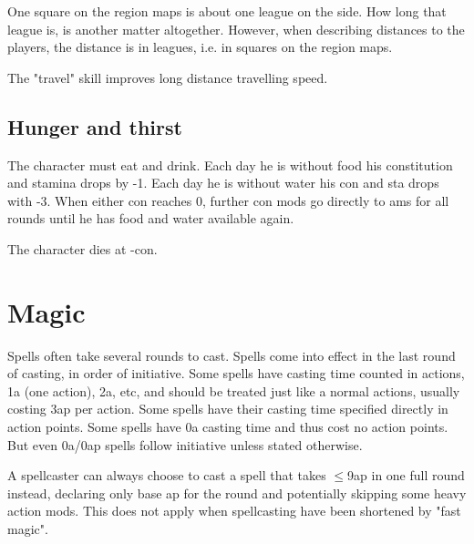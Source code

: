 One square on the region maps is about one league on the side. How long that league is, is another matter altogether. However, when describing distances to the players, the distance is in leagues, i.e. in squares on the region maps.


The "travel" skill improves long distance travelling speed.


\subsection*{Hunger and thirst}
The character must eat and drink. Each day he is without food his constitution and stamina drops by -1. Each day he is without water his con and sta drops with -3. When either con reaches 0, further con mods go directly to ams for all rounds until he has food and water available again.

The character dies at -con.











\section*{Magic}


Spells often take several rounds to cast. Spells come into effect in the last round of casting, in order of initiative. Some spells have casting time counted in actions, 1a (one action), 2a, etc, and should be treated just like a normal actions, usually costing 3ap per action. Some spells have their casting time specified directly in action points. Some spells have 0a casting time and thus cost no action points. But even 0a/0ap spells follow initiative unless stated otherwise.

A spellcaster can always choose to cast a spell that takes $\leq$9ap in one full round instead, declaring only base ap for the round and potentially skipping some heavy action mods. This does not apply when spellcasting have been shortened by "fast magic".


